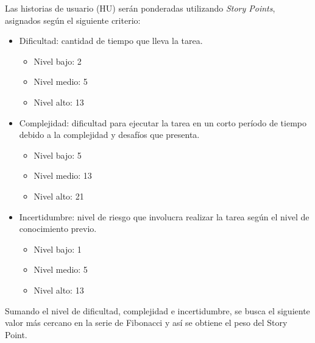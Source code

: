 \documentclass[
11pt, %
]{charter}
\begin{document}
Las historias de usuario (HU) serán ponderadas utilizando \textit{Story Points}, asignados según el
siguiente criterio:

\begin{itemize}
	\item Dificultad: cantidad de tiempo que lleva la tarea.
		\begin{itemize}
			\item Nivel bajo: 2
			\item Nivel medio: 5
			\item Nivel alto: 13
		\end{itemize}
	\item Complejidad: dificultad para ejecutar la tarea en un corto período de tiempo debido a la
complejidad y desafíos que presenta.
		\begin{itemize}
			\item Nivel bajo: 5
			\item Nivel medio: 13
			\item Nivel alto: 21
		\end{itemize}
	\item Incertidumbre: nivel de riesgo que involucra realizar la tarea según el nivel de conocimiento
previo.
		\begin{itemize}
			\item Nivel bajo: 1
			\item Nivel medio: 5
			\item Nivel alto: 13
		\end{itemize}
\end{itemize}

Sumando el nivel de dificultad, complejidad e incertidumbre, se busca el siguiente valor más
cercano en la serie de Fibonacci y así se obtiene el peso del Story Point.
\end{document}
